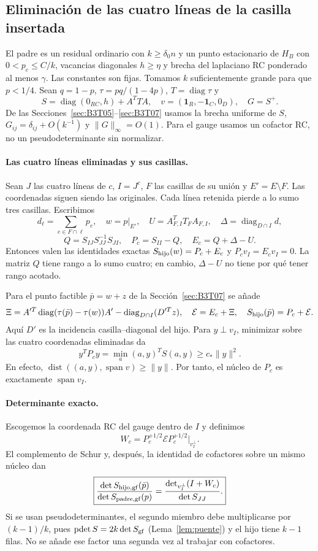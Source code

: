 \subsection{Eliminación de las cuatro líneas de la casilla insertada}\label{sec:B4T01}
El padre es un residual ordinario con $k\ge\delta_0n$ y un punto estacionario
de $H_B$ con $0<p_e\le C/k$, vacancias diagonales $h\ge\eta$ y brecha del
laplaciano RC ponderado al menos $\gamma$. Las constantes son fijas.
Tomamos $k$ suficientemente grande para que $p<1/4$.
Sean $q=1-p$, $\tau=pq/(1-4p)$, $T=\operatorname{diag}\tau$ y
\[
 S=\operatorname{diag}(0_{RC},h)+A^TTA,\quad
 v=(\mathbf1_R,-\mathbf1_C,0_D),\quad G=S^+.
\]
De las Secciones~\ref{sec:B3T05}--\ref{sec:B3T07} usamos la brecha uniforme de $S$,
$G_{ij}=\delta_{ij}+O(k^{-1})$ y $\|G\|_\infty=O(1)$.
Para el gauge usamos un cofactor RC, no un pseudodeterminante sin normalizar.

\paragraph{Las cuatro líneas eliminadas y sus casillas.}
Sean $J$ las cuatro líneas de $c$, $I=J^c$, $F$ las casillas de su unión
y $E'=E\setminus F$. Las coordenadas siguen siendo las originales.
Cada línea retenida pierde a lo sumo tres casillas. Escribimos
\[
 d_\ell=\sum_{e\in F\cap\ell}p_e,\quad w=p|_{E'},\quad
 U=A_{F,I}^TT_FA_{F,I},\quad \Delta=\operatorname{diag}_{D\cap I}d,
\]
\[
 Q=S_{IJ}S_{JJ}^{-1}S_{JI},\quad P_c=S_{II}-Q,\quad E_c=Q+\Delta-U.
\]
Entonces valen las identidades exactas $S_{\rm hijo}(w)=P_c+E_c$ y
$P_cv_I=E_cv_I=0$. La matriz $Q$ tiene rango a lo sumo cuatro;
en cambio, $\Delta-U$ no tiene por qué tener rango acotado.

Para el punto factible $\bar p=w+z$ de la Sección~\ref{sec:B3T07} se añade
\[
 \Xi=A'^T\operatorname{diag}(\tau(\bar p)-\tau(w))A'
       -\operatorname{diag}_{D\cap I}(D'^Tz),\quad
 \mathcal E=E_c+\Xi,\quad S_{\rm hijo}(\bar p)=P_c+\mathcal E.
\]
Aquí $D'$ es la incidencia casilla--diagonal del hijo.
Para $y\perp v_I$, minimizar sobre las cuatro coordenadas eliminadas da
\[
 y^TP_cy=\min_a(a,y)^TS(a,y)\ge c_*\|y\|^2.
\]
En efecto, $\operatorname{dist}((a,y),\operatorname{span}v)\ge\|y\|$.
Por tanto, el núcleo de $P_c$ es exactamente $\operatorname{span}v_I$.

\paragraph{Determinante exacto.}
Escogemos la coordenada RC del gauge dentro de $I$ y definimos
\[
 W_c=P_c^{+1/2}\mathcal E P_c^{+1/2}\big|_{v_I^\perp}.
\]
El complemento de Schur y, después, la identidad de cofactores sobre un mismo núcleo dan
\[
 \boxed{\frac{\det S_{{\rm hijo},\rm gf}(\bar p)}{\det S_{{\rm padre},\rm gf}(p)}
 =\frac{\det_{v_I^\perp}(I+W_c)}{\det S_{JJ}}.}
\]
Si se usan pseudodeterminantes, el segundo miembro debe multiplicarse por $(k-1)/k$,
pues $\operatorname{pdet}S=2k\det S_{\rm gf}$ (Lema~\ref{lem:puente}) y el hijo tiene $k-1$ filas.
No se añade ese factor una segunda vez al trabajar con cofactores.

